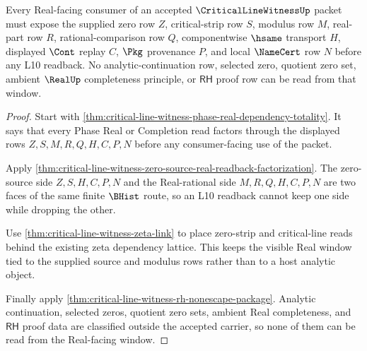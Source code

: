 \begin{theorem}
\label{thm:critical-line-witness-real-window-nonescape}
Every Real-facing consumer of an accepted $\CriticalLineWitnessUp$ packet must expose the supplied zero row $Z$, critical-strip row $S$, modulus row $M$, real-part row $R$, rational-comparison row $Q$, componentwise $\hsame$ transport $H$, displayed $\Cont$ replay $C$, $\Pkg$ provenance $P$, and local $\NameCert$ row $N$ before any L10 readback. No analytic-continuation row, selected zero, quotient zero set, ambient $\RealUp$ completeness principle, or $\mathsf{RH}$ proof row can be read from that window.
\end{theorem}
\begin{proof}
Start with \autoref{thm:critical-line-witness-phase-real-dependency-totality}. It says that every Phase Real or Completion read factors through the displayed rows $Z,S,M,R,Q,H,C,P,N$ before any consumer-facing use of the packet.

Apply \autoref{thm:critical-line-witness-zero-source-real-readback-factorization}. The zero-source side $Z,S,H,C,P,N$ and the Real-rational side $M,R,Q,H,C,P,N$ are two faces of the same finite $\BHist$ route, so an L10 readback cannot keep one side while dropping the other.

Use \autoref{thm:critical-line-witness-zeta-link} to place zero-strip and critical-line reads behind the existing zeta dependency lattice. This keeps the visible Real window tied to the supplied source and modulus rows rather than to a host analytic object.

Finally apply \autoref{thm:critical-line-witness-rh-nonescape-package}. Analytic continuation, selected zeros, quotient zero sets, ambient Real completeness, and $\mathsf{RH}$ proof data are classified outside the accepted carrier, so none of them can be read from the Real-facing window.
\end{proof}

